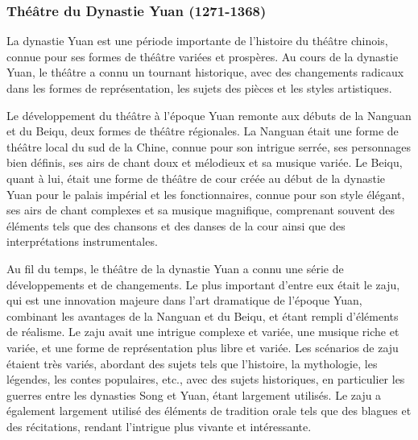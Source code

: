 \documentclass[UTF8,a4paper,12pt]{ctexart}
\numberwithin{equation}{section}
\newcommand{\mycite}[1]{\cite{#1}}
\begin{document}
\subsubsection{Théâtre du Dynastie Yuan (1271-1368)}
La dynastie Yuan est une période importante de l'histoire du théâtre chinois, connue pour ses formes de théâtre variées et prospères. Au cours de la dynastie Yuan, le théâtre a connu un tournant historique, avec des changements radicaux dans les formes de représentation, les sujets des pièces et les styles artistiques.

Le développement du théâtre à l'époque Yuan remonte aux débuts de la Nanguan et du Beiqu, deux formes de théâtre régionales. La Nanguan était une forme de théâtre local du sud de la Chine, connue pour son intrigue serrée, ses personnages bien définis, ses airs de chant doux et mélodieux et sa musique variée. Le Beiqu, quant à lui, était une forme de théâtre de cour créée au début de la dynastie Yuan pour le palais impérial et les fonctionnaires, connue pour son style élégant, ses airs de chant complexes et sa musique magnifique, comprenant souvent des éléments tels que des chansons et des danses de la cour ainsi que des interprétations instrumentales.

Au fil du temps, le théâtre de la dynastie Yuan a connu une série de développements et de changements. Le plus important d'entre eux était le zaju, qui est une innovation majeure dans l'art dramatique de l'époque Yuan, combinant les avantages de la Nanguan et du Beiqu, et étant rempli d'éléments de réalisme. Le zaju avait une intrigue complexe et variée, une musique riche et variée, et une forme de représentation plus libre et variée. Les scénarios de zaju étaient très variés, abordant des sujets tels que l'histoire, la mythologie, les légendes, les contes populaires, etc., avec des sujets historiques, en particulier les guerres entre les dynasties Song et Yuan, étant largement utilisés. Le zaju a également largement utilisé des éléments de tradition orale tels que des blagues et des récitations, rendant l'intrigue plus vivante et intéressante\mycite{33}.
\end{document}
